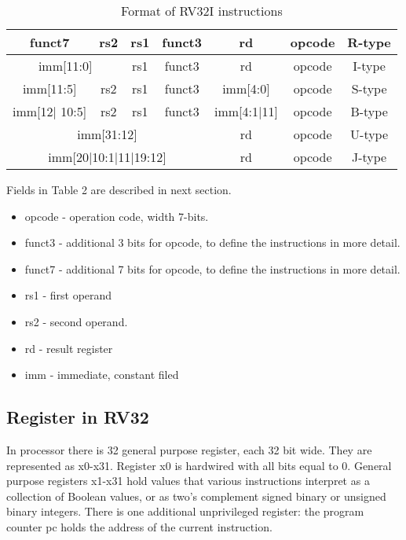 \documentclass{scrreprt}
\begin{document}
      \begin{table}[ht]
          \centering
          \begin{tabular}{|c|c|c|c|c|c|c|} \hline  
               funct7 & rs2 & rs1 & funct3 & rd & opcode & R-type\\ \hline  
               \multicolumn{2}{|c|}{imm[11:0]} & rs1 & funct3 & rd & opcode & I-type \\ \hline  
               imm[11:5] & rs2 & rs1 & funct3 & imm[4:0] & opcode &  S-type\\ \hline  
               imm[12| 10:5]& rs2 & rs1 & funct3 & imm[4:1|11] & opcode &  B-type\\ \hline  
               \multicolumn{4}{|c|}{imm[31:12]}  & rd & opcode &  U-type\\ \hline  
               \multicolumn{4}{|c|}{imm[20|10:1|11|19:12]} & rd & opcode &  J-type\\ \hline 
          \end{tabular}
          \caption{Format of RV32I instructions}
          \label{tab:table2}
      \end{table}  

    Fields in Table 2 are described in next section.
     \begin{itemize}
        \item  opcode - operation code, width 7-bits.
        \item  funct3 - additional 3 bits for opcode, to define the instructions in more detail.
        \item  funct7 - additional 7 bits for opcode, to define the instructions in more detail.
        \item  rs1 - first operand
        \item  rs2 - second operand.
        \item  rd - result register
        \item  imm - immediate, constant filed
    \end{itemize}
    \subsection*{Register in RV32}
    In processor there is 32 general purpose register, each 32 bit wide. They are represented as x0-x31. Register x0 is hardwired with all bits equal to 0. General purpose registers x1-x31 hold values that various instructions interpret as a collection of Boolean values, or as two's complement signed binary or unsigned binary integers. 
    There is one additional unprivileged register: the program counter pc holds the address of the
current instruction.
    
\end{document}

